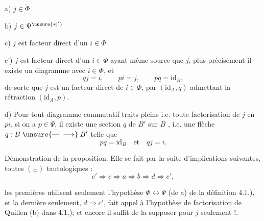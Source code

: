 a) $j\in\widetilde\Phi$

b) $j\in\Psi^{\unsure{*|'}}$

c) $j$ est facteur direct d'un $i\in\Phi$

c') $j$ est facteur direct d'un $i\in\Phi$ ayant même source que $j$, plus précisément il existe un diagramme
avec $i\in\Phi$, et
\[
qj=i,\qquad pi=j,\qquad pq=\mathrm{id}_B,
\tag*{(4.2.1)}
\]
de sorte que $j$ est un facteur direct de $i\in\Phi$, par $(\mathrm{id}_A,q)$ admettant la rétraction $(\mathrm{id}_A,p)$.

d) Pour tout diagramme commutatif traits pleins
i.e. toute factorisation de $j$ en $pi$, si on a $p\in\Psi$, il existe une section $q$ de $B'$ sur $B$ , i.e. une flèche $q:B\mathrel{\unsure{\text{---}|\longrightarrow}}B'$ telle que
\[
pq=\mathrm{id}_B\quad\text{et}\quad qj=i.
\]

Démonstration de la proposition. Elle se fait par la suite d'implications suivantes, toutes $(\pm)$ tautologiques :
\[
c'\Longrightarrow c\Longrightarrow a\Longrightarrow b\Longrightarrow d\Longrightarrow c',
\]

 les  premières utilisent seulement l'hypothèse $\Phi\longleftrightarrow\Psi$ (de a) de la définition 4.1.), et la dernière seulement, $d\Longrightarrow c'$, fait appel à l'hypothèse de factorisation de Quillen (b) dans 4.1.); et encore il suffit de la supposer pour $j$ seulement !.

